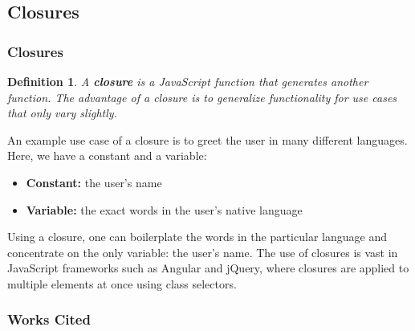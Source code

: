 \documentclass[aspectratio=169]{beamer}
\newtheorem{defn}{Definition}
\begin{document}
\subsection{Closures}
\begin{frame}
\frametitle{Closures}
\begin{defn}
A \textbf{closure} is a JavaScript function that generates another function. The advantage of a closure is to generalize functionality for use cases that only vary slightly.
\end{defn}

\pause
An example use case of a closure is to greet the user in many different languages. Here, we have a constant and a variable:
\begin{itemize}
	\item \textbf{Constant:} the user's name
	\item \textbf{Variable:} the exact words in the user's native language
\end{itemize}

\pause
Using a closure, one can boilerplate the words in the particular language and concentrate on the only variable: the user's name. The use of closures is vast in JavaScript frameworks such as Angular and jQuery, where closures are applied to multiple elements at once using class selectors.
\end{frame}

\begin{frame}
\frametitle{Works Cited}

\end{frame}
\end{document}
